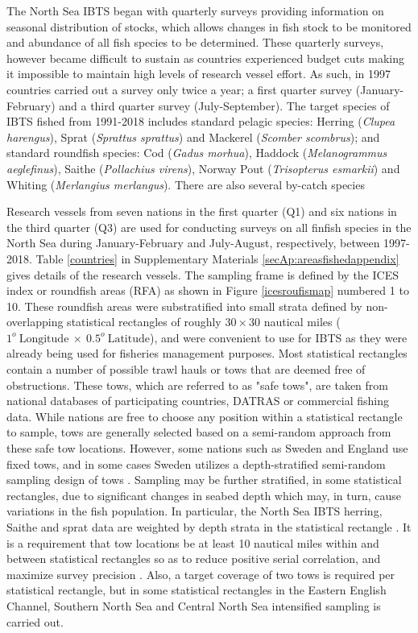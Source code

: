 \documentclass[a4paper 12pt]{article}
\numberwithin{equation}{section}
\begin{document}
\indent The North Sea IBTS began with quarterly surveys providing information on seasonal distribution of stocks, which allows changes in fish stock to be monitored and abundance of all fish species to be determined. These quarterly surveys, however became difficult to sustain as countries experienced budget cuts making it impossible to maintain high levels of research vessel effort. As such, in 1997 countries carried out a survey only twice a year; a first quarter survey (January-February) and a third quarter survey (July-September). The target species of IBTS fished from 1991-2018 includes standard pelagic species: Herring (\textit{Clupea harengus}), Sprat (\textit{Sprattus sprattus}) and Mackerel (\textit{Scomber scombrus}); and standard roundfish species: Cod (\textit{Gadus morhua}), Haddock (\textit{Melanogrammus aeglefinus}), Saithe (\textit{Pollachius virens}),  Norway Pout (\textit{Trisopterus esmarkii})  and Whiting (\textit{Merlangius merlangus}). There are also several by-catch species \citep{ICES2006Report}

Research vessels from seven nations in the first quarter (Q1) and six nations in the third quarter (Q3) are used for conducting surveys on all finfish species in the North Sea during January-February and July-August, respectively, between 1997-2018. Table \ref{countries} in Supplementary Materials \ref{secAp:areasfishedappendix} gives details of the research vessels. The sampling frame is defined by the ICES index or roundfish areas (RFA) as shown in Figure \ref{icesroufismap} numbered 1 to 10. These  roundfish areas were substratified into small strata defined by non-overlapping statistical rectangles of roughly $30 \times 30$ nautical miles ($1^{o} \  \mathrm{Longitude} \ \times  \  0.5^{o} \ \mathrm{Latitude}$), and were convenient to use for IBTS as they were already being used for fisheries management purposes. Most statistical rectangles contain a number of possible trawl hauls or tows that are deemed free of obstructions. These tows, which are referred to as   "safe tows", are taken from national databases of participating countries, DATRAS \citep{datras} or commercial fishing data. While nations are free to choose any position within a statistical rectangle to sample, tows are generally selected based on a semi-random approach from these safe tow locations. However, some nations such as Sweden and England use fixed tows, and in some cases Sweden utilizes a depth-stratified semi-random sampling design of tows \citep{ICES2018}. Sampling may be further stratified, in some statistical rectangles, due to significant changes in seabed depth which may, in turn, cause variations in the fish population. In particular, the North Sea IBTS herring, Saithe and sprat data are weighted by depth strata in the statistical rectangle \citep{ICES2013}. It is a requirement that tow locations be at least 10 nautical miles within and between statistical rectangles so as to reduce positive serial correlation, and maximize survey precision \citep{ICES2018}. Also, a target coverage of two tows is required per statistical rectangle\citep{ICES2015}, but in some statistical rectangles in the Eastern English Channel, Southern North Sea and Central North Sea intensified sampling is carried out.
\end{document}
